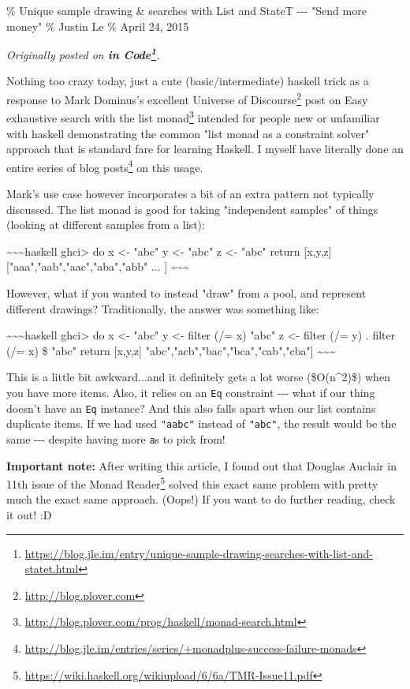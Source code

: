 \documentclass[]{article}
\renewcommand{\href}[2]{#2\footnote{\url{#1}}}
\begin{document}
\% Unique sample drawing \& searches with List and StateT -\/-\/- "Send more
money" \% Justin Le \% April 24, 2015

\emph{Originally posted on
\textbf{\href{https://blog.jle.im/entry/unique-sample-drawing-searches-with-list-and-statet.html}{in
Code}}.}

Nothing too crazy today, just a cute (basic/intermediate) haskell trick as a
response to Mark Dominus's excellent \href{http://blog.plover.com}{Universe of
Discourse} post on
\href{http://blog.plover.com/prog/haskell/monad-search.html}{Easy exhaustive
search with the list monad} intended for people new or unfamiliar with haskell
demonstrating the common "list monad as a constraint solver" approach that is
standard fare for learning Haskell. I myself have literally done
\href{http://blog.jle.im/entries/series/+monadplus-success-failure-monads}{an
entire series of blog posts} on this usage.

Mark's use case however incorporates a bit of an extra pattern not typically
discussed. The list monad is good for taking "independent samples" of things
(looking at different samples from a list):

\textasciitilde{}\textasciitilde{}\textasciitilde{}haskell ghci\textgreater{} do
x \textless{}- "abc" y \textless{}- "abc" z \textless{}- "abc" return
{[}x,y,z{]} {[}"aaa","aab","aac","aba","abb" ... {]}
\textasciitilde{}\textasciitilde{}\textasciitilde{}

However, what if you wanted to instead "draw" from a pool, and represent
different drawings? Traditionally, the answer was something like:

\textasciitilde{}\textasciitilde{}\textasciitilde{}haskell ghci\textgreater{} do
x \textless{}- "abc" y \textless{}- filter (/= x) "abc" z \textless{}- filter
(/= y) . filter (/= x) \$ "abc" return {[}x,y,z{]}
"abc","acb","bac","bca","cab","cba"{]}
\textasciitilde{}\textasciitilde{}\textasciitilde{}

This is a little bit awkward...and it definitely gets a lot worse
(\$O(n\^{}2)\$) when you have more items. Also, it relies on an \texttt{Eq}
constraint -\/-\/- what if our thing doesn't have an \texttt{Eq} instance? And
this also falls apart when our list contains duplicate items. If we had used
\texttt{"aabc"} instead of \texttt{"abc"}, the result would be the same -\/-\/-
despite having more \texttt{\textquotesingle{}a\textquotesingle{}}s to pick
from!

\textbf{Important note:} After writing this article, I found out that Douglas
Auclair in \href{https://wiki.haskell.org/wikiupload/6/6a/TMR-Issue11.pdf}{11th
issue of the Monad Reader} solved this exact same problem with pretty much the
exact same approach. (Oops!) If you want to do further reading, check it out! :D
\end{document}
